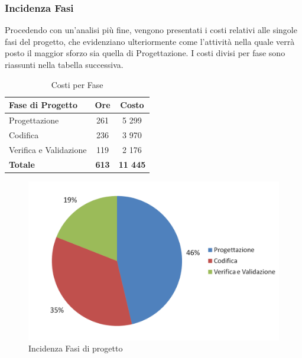 \documentclass[a4paper,11pt]{article}
\begin{document}
	\subsubsection{Incidenza Fasi}
	 Procedendo con un'analisi più fine, vengono presentati i costi relativi alle singole fasi del progetto, che evidenziano ulteriormente come l'attività nella quale verrà posto il maggior sforzo sia quella di Progettazione. I costi divisi per fase sono riassunti nella tabella successiva.
	\begin{table}[h!]
	\begin{center}
		\begin{tabular}{l c c}
			\textbf{Fase di Progetto} & \textbf{Ore} & \textbf{Costo}\\
			\midrule
			Progettazione & 261 & 5 299 \\
			Codifica & 236 & 3 970 \\
			Verifica e Validazione & 119 & 2 176\\
			\midrule
			\textbf{Totale} & \textbf{613} & \textbf{11 445}
		\end{tabular} 
		\end{center}
	\caption{Costi per Fase}
	\end{table}
	\begin{figure}[h!]
		\centering
		\includegraphics[scale=0.6]{../Images/pie_chart-Preventivo_Fasi}
		\caption{Incidenza Fasi di progetto}
	\end{figure}
	\pagebreak
\end{document}
